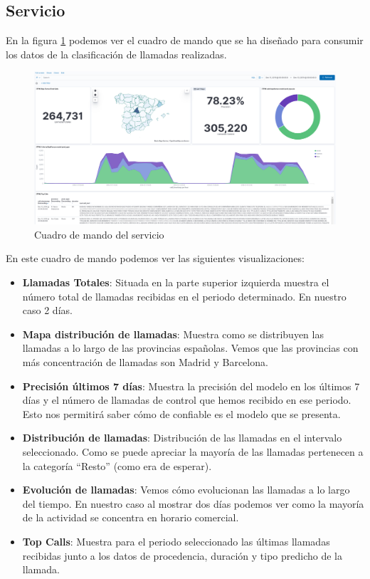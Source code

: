\subsection{Servicio}

En la figura \ref{fig:cmserv} podemos ver el cuadro de mando que se ha diseñado para consumir los datos de la clasificación de llamadas realizadas.  

\begin{figure}[!ht]
	\centering
	\includegraphics[width=1\textwidth]{images/serv/CM-calls}
	\caption{Cuadro de mando del servicio}
	\label{fig:cmserv}
\end{figure}


En este cuadro de mando podemos ver las siguientes visualizaciones: 

\begin{itemize}
\item \textbf{Llamadas Totales}: Situada en la parte superior izquierda muestra el número total de llamadas recibidas en el periodo determinado. En nuestro caso 2 días. 
\item \textbf{Mapa distribución de llamadas}: Muestra como se distribuyen las llamadas a lo largo de las provincias españolas. Vemos que las provincias con más concentración de llamadas son Madrid y Barcelona.

\item \textbf{Precisión últimos 7 días}: Muestra la precisión del modelo en los últimos 7 días y el número de llamadas de control que hemos recibido en ese periodo. Esto nos permitirá saber cómo de confiable es el modelo que se presenta.

\item \textbf{Distribución de llamadas}: Distribución de las llamadas en el intervalo seleccionado. Como se puede apreciar la mayoría de las llamadas pertenecen a la categoría ``Resto'' (como era de esperar). 

\item \textbf{Evolución de llamadas}: Vemos cómo evolucionan las llamadas a lo largo del tiempo. En nuestro caso al mostrar dos días podemos ver como la mayoría de la actividad se concentra en horario comercial.

\item \textbf{Top Calls}: Muestra para el periodo seleccionado las últimas llamadas recibidas junto a los datos de procedencia, duración y tipo predicho de la llamada.

\end{itemize}

